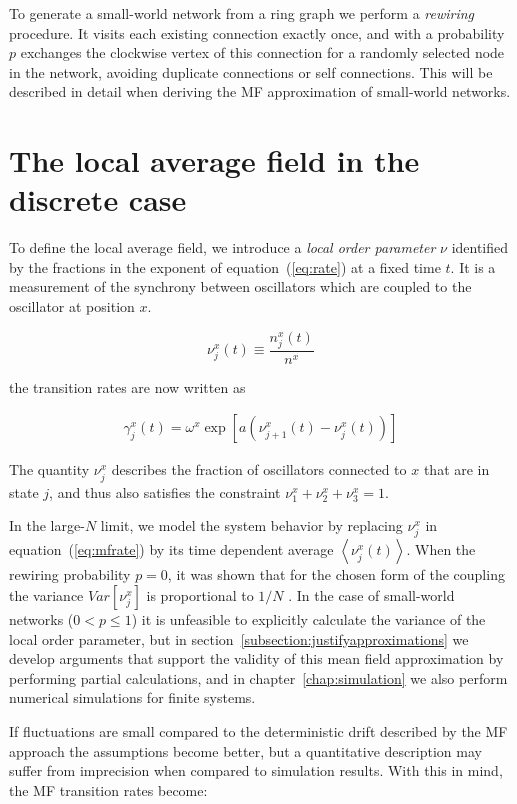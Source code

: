To generate a small-world network from a ring graph we perform a \textit{rewiring} procedure. It visits each existing connection
exactly once, and with a probability $p$ exchanges the clockwise vertex of this connection for a randomly selected node in the network,
avoiding duplicate connections or self connections. This will be described in detail when deriving the MF approximation of small-world
networks.

\section{The local average field in the discrete case}

To define the local average field, we introduce a \textit{local order parameter} $\nu$ identified by the fractions in the exponent of
equation~(\ref{eq:rate}) at a fixed time $t$. It is a measurement of the synchrony between oscillators which are coupled to the
oscillator at position $x$.

\begin{equation}
  \nu^x_j(t) \equiv \frac{n^x_j(t)}{n^x}
\end{equation}

\noindent the transition rates are now written as

\begin{align}
  \gamma^x_j(t) = \omega^x\exp\left[ a(\nu^x_{j+1}(t) - \nu^x_j(t)) \right]
  \label{eq:mfrate}
\end{align}

The quantity $\nu^x_j$ describes the fraction of oscillators connected to $x$ that are in state $j$, and thus also satisfies the
constraint $\nu^x_1+\nu^x_2+\nu^x_3=1$.

In the large-$N$ limit, we model the system behavior by replacing $\nu^x_j$ in equation~(\ref{eq:mfrate}) by its time dependent average
$\left< \nu^x_j(t) \right>$. When the rewiring probability $p=0$, it was shown that for the chosen form of the coupling the variance
$Var[\nu^x_j]$ is proportional to $1/N$ \cite{escaff2014arrays}. In the case of small-world networks ($0<p \leq 1$) it is unfeasible to
explicitly calculate the variance of the local order parameter, but in section~\ref{subsection:justifyapproximations} we develop
arguments that support the validity of this mean field approximation by performing partial calculations, and in
chapter~\ref{chap:simulation} we also perform numerical simulations for finite systems.

If fluctuations are small compared to the deterministic drift described by the MF approach the assumptions become better, but a
quantitative description may suffer from imprecision when compared to simulation results. With this in mind, the MF transition rates
become:

